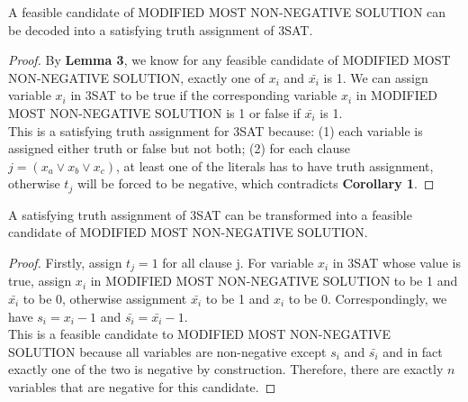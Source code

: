\begin{lemma} A feasible candidate of MODIFIED MOST NON-NEGATIVE SOLUTION can be decoded into a satisfying truth assignment of 3SAT.\end{lemma}
\begin{proof}
By \textbf{Lemma 3}, we know for any feasible candidate of MODIFIED MOST NON-NEGATIVE SOLUTION, exactly one of $x_i$ and $\bar{x_i}$ is 1. We can assign variable $x_i$  in 3SAT to be true if the corresponding variable $x_i$ in MODIFIED MOST NON-NEGATIVE SOLUTION is 1 or false if $\bar{x_i}$ is 1.\\
This is a satisfying truth assignment for 3SAT because: (1) each variable is assigned either truth or false but not both; (2) for each clause $j = (x_a \lor x_b \lor x_c)$, at least one of the literals has to have truth assignment, otherwise $t_j$ will be forced to be negative, which contradicts \textbf{Corollary 1}.  
\end{proof}
\begin{lemma} A satisfying truth assignment of 3SAT can be transformed into a feasible candidate of MODIFIED MOST NON-NEGATIVE SOLUTION.\end{lemma}
\begin{proof} Firstly, assign $t_j = 1$ for all clause j. For variable $x_i$ in 3SAT whose value is true, assign $x_i$ in MODIFIED MOST NON-NEGATIVE SOLUTION to be 1 and $\bar{x_i}$ to be 0, otherwise assignment $\bar{x_i}$ to be 1 and $x_i$ to be 0. Correspondingly, we have $s_i = x_i - 1$ and $\bar{s_i} = \bar{x_i} -1$.\\
This is a feasible candidate to MODIFIED MOST NON-NEGATIVE SOLUTION because all variables are non-negative except $s_i$ and $\bar{s_i}$ and in fact exactly one of the two is negative by construction. Therefore, there are exactly $n$ variables that are negative for this candidate.  
\end{proof}